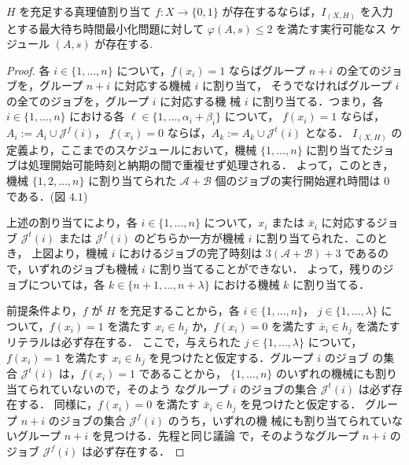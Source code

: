 \documentclass[12pt]{optlab-bachelor}
\begin{document}
\begin{lemma}\label{l_6}
  $H$ を充足する真理値割り当て $f : X \to \{0,1\}$ が存在するならば，$I_{(X,H)}$ を入力とする最大待ち時間最小化問題に対して
  $\varphi(A,s) \le 2$ を満たす実行可能なス
  ケジュール $(A,s)$ が存在する.
\end{lemma}

\begin{proof}
  各 $i \in \{1,\ldots, n\}$ について，$f(x_i) = 1$ ならばグループ $n +
  i$ の全てのジョブを，グループ $n + i$ に対応する機械 $i$ に割り当て，
  そうでなければグループ $i$ の全てのジョブを，グループ $i$ に対応する機
  械 $i$ に割り当てる．つまり，各 $i \in \{1,\ldots, n\}$ における各
  $\ell \in \{1,\ldots,\alpha_i + \beta_i\}$ について，
  $f(x_i) = 1$ ならば，$A_i := A_i \cup \mathcal{J}^f(i)$，
  $f(x_i) = 0$ ならば，$A_k := A_k \cup \mathcal{J}^t(i)$ となる．
  $I_{(X,H)}$ の定義より，ここまでのスケジュールにおいて，機械
  $\{1,\ldots, n\}$ に割り当てたジョブは処理開始可能時刻と納期の間で重複せず処理される．
  よって，このとき，機械 $\{1,2,\ldots,n\}$ に割り当てられた
  $\mathcal{A} + \mathcal{B}$ 個のジョブの実行開始遅れ時間は $0$ である．(図 $4.1$)

  上述の割り当てにより，各 $i \in \{1,\ldots,n\}$ について，$x_i$ または
  $\bar x_i$ に対応するジョブ $\mathcal{J}^t(i)$ または
  $\mathcal{J}^f(i)$ のどちらか一方が機械 $i$ に割り当てられた．このとき，
  上図より，機械 $i$ におけるジョブの完了時刻は $3(\mathcal{A} +
  \mathcal{B}) + 3$ であるので，いずれのジョブも機械 $i$ に割り当てることができない．
  よって，残りのジョブについては，各 $k \in \{n + 1,\ldots,n +
  \lambda\}$ における機械 $k$ に割り当てる．

  前提条件より，$f$ が $H$ を充足することから，各 $i \in \{1,\ldots,n\}$，
  $j \in \{1, \ldots, \lambda \}$ について，$f(x_i) = 1$ を満たす $x_i
  \in h_j$ か，$f(x_i) = 0$ を満たす $\bar x_i \in h_j$ を満たすリテラルは必ず存在する．
  ここで，与えられた $j \in \{1, \ldots, \lambda \}$ について，$f(x_i) =
  1$ を満たす $x_i \in h_j$ を見つけたと仮定する．グループ $i$ のジョブ
  の集合 $\mathcal{J}^t(i)$ は，$f(x_i) = 1$ であることから，
  $\{1,\ldots,n\}$ のいずれの機械にも割り当てられていないので，そのよう
  なグループ $i$ のジョブの集合 $\mathcal{J}^t(i)$ は必ず存在する．
  同様に，$f(x_i) = 0$ を満たす $\bar x_i \in h_j$ を見つけたと仮定する．
  グループ $n + i$ のジョブの集合 $\mathcal{J}^f(i)$ のうち，いずれの機
  械にも割り当てられていないグループ $n + i$ を見つける．先程と同じ議論
  で，そのようなグループ $n + i$ のジョブ $\mathcal{J}^f(i)$ は必ず存在する．


\end{proof}
\end{document}
